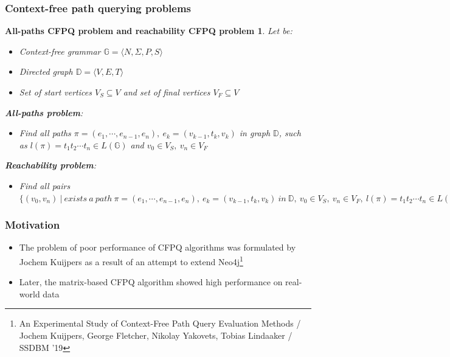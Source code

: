 \documentclass{beamer}
\newtheorem{task}{All-paths CFPQ problem and reachability CFPQ problem }
\begin{document}
\begin{frame}[fragile]
  \transwipe[direction=90]
  \frametitle{Context-free path querying problems}
   \begin{task}
  Let be:
     \begin{itemize}
    \item Context-free grammar $\mathbb{G}  = \langle N, \Sigma, P, S \rangle$
     \item Directed graph $ \mathbb{D} = \langle V, E, T \rangle$
     \item Set of start vertices $V_S \subseteq V$  and set of final vertices \mbox{$V_F \subseteq V$}
\end{itemize} 
\textbf{All-paths problem}:
\begin{itemize}
    \item Find all paths $\pi = (e_1, \cdots, e_{n - 1}, e_n), ~ e_k = (v_{k - 1}, t_k, v_k)$ in graph $ \mathbb{D}$, such as $l(\pi) = t_1t_2 \cdots t_n \in L(\mathbb{G})$ and $v_0 \in V_S, ~v_n \in V_F$
\end{itemize}
\textbf{Reachability problem}:
\begin{itemize}
    \item Find all pairs $\{(v_0, v_n ) ~|~ exists~a~path ~\pi = (e_1, \cdots, e_{n - 1}, e_n), ~ e_k = (v_{k - 1}, t_k, v_k)~ in ~\mathbb{D}, ~v_0 \in V_S, ~v_n \in V_F, ~l(\pi) = t_1t_2 \cdots t_n \in L(\mathbb{G}) \}$
\end{itemize}
 \end{task}
\end{frame}

\begin{frame}[fragile]
  \transwipe[direction=90]
  \frametitle{Motivation}
  \begin{itemize}
        \item The problem of poor performance of CFPQ algorithms was formulated by Jochem Kuijpers as a result of an attempt to extend Neo4j\footnote{An Experimental Study of Context-Free Path Query Evaluation Methods / Jochem Kuijpers, George Fletcher, Nikolay Yakovets, Tobias Lindaaker / SSDBM ’19}
      \item Later, the matrix-based CFPQ algorithm showed high performance on real-world data
  \end{itemize}
\end{frame}
\end{document}
